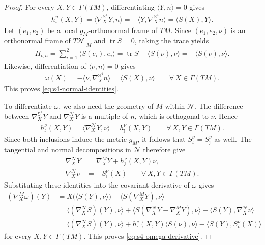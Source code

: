 \documentclass[a4paper,11pt,oneside,reqno]{amsart}
\numberwithin{equation}{section}
\theoremstyle{definition}
\begin{document}
\begin{proof}
    For every $X,Y\in\Gamma(TM)$, differentiating
    $\langle Y,n\rangle=0$ gives
    \begin{align*}
        h_\iota^n(X,Y)=\langle\nabla^{\mathbb{S}^4}_XY,n\rangle=-\langle Y,\nabla^{\mathbb{S}^4}_Xn\rangle
        =\langle S(X),Y\rangle.
    \end{align*}
    Let $(e_1,e_2)$ be a local $g_M$-orthonormal frame of $TM$.
    Since $(e_1,e_2,\nu)$ is an orthonormal frame of
    $T\mathcal{N}|_M$ and $\operatorname{tr}S=0$, taking the
    trace yields
    \begin{align*}
        H_{\iota,n}
        =\sum_{i=1}^2\langle S(e_i),e_i\rangle
        =\operatorname{tr}S-\langle S(\nu),\nu\rangle
        =-\langle S(\nu),\nu\rangle.
    \end{align*}
    Likewise, differentiation of $\langle\nu,n\rangle=0$
    gives
    \begin{align*}
        \omega(X)
        =-\langle\nu,\nabla^{\mathbb{S}^4}_Xn\rangle
        =\langle S(X),\nu\rangle
        \qquad\forall\,X\in\Gamma(TM).
    \end{align*}
    This proves \eqref{eq:s4-normal-identities}.

    To differentiate $\omega$, we also need the geometry of
    $M$ within $\mathcal{N}$. The difference between
    $\nabla^{\mathbb{S}^4}_XY$ and $\nabla^{\mathcal{N}}_XY$
    is a multiple of $n$, which is orthogonal to $\nu$.
    Hence
    \begin{align*}
        h_\iota^\nu(X,Y)
        =\langle\nabla^{\mathcal{N}}_XY,\nu\rangle
        =h_\jmath^\nu(X,Y)
        \qquad\forall\,X,Y\in\Gamma(TM).
    \end{align*}
    Since both inclusions induce the metric $g_M$, it
    follows that $S_\iota^\nu=S_\jmath^\nu$ as well.
    The tangential and normal decompositions in $\mathcal{N}$
    therefore give
    \begin{align*}
        \nabla^{\mathcal{N}}_XY
        &=\nabla^M_XY+h_\jmath^\nu(X,Y)\nu,\\
        \nabla^{\mathcal{N}}_X\nu
        &=-S_\jmath^\nu(X)
        \qquad\forall\,X,Y\in\Gamma(TM).
    \end{align*}
    Substituting these identities into the covariant
    derivative of $\omega$ gives
    \begin{align*}
        (\nabla^M_X\omega)(Y)
        &=X\bigl(\langle S(Y),\nu\rangle\bigr)
        -\langle S(\nabla^M_XY),\nu\rangle\\
        &=\langle(\nabla^{\mathcal{N}}_XS)(Y),\nu\rangle
        +\langle S(\nabla^{\mathcal{N}}_XY
        -\nabla^M_XY),\nu\rangle
        +\langle S(Y),\nabla^{\mathcal{N}}_X\nu\rangle\\
        &=\langle(\nabla^{\mathcal{N}}_XS)(Y),\nu\rangle
        +h_\iota^\nu(X,Y)\langle S(\nu),\nu\rangle
        -\langle S(Y),S_\iota^\nu(X)\rangle
    \end{align*}
    for every $X,Y\in\Gamma(TM)$. This proves
    \eqref{eq:s4-omega-derivative}.


\end{proof}
\end{document}
